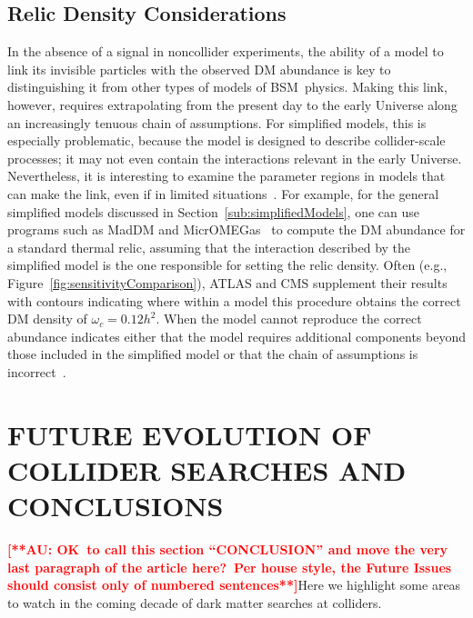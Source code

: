 \documentclass{ar-1col}
\newcommand{\IP}{invisible particle}
\begin{document}
\subsection{Relic Density Considerations}

In the absence of a signal in noncollider experiments, the ability of a
model to link its {\IP}s with the observed DM abundance is key to
distinguishing it from other types of models of BSM\ physics. Making this link, however, requires extrapolating
from the present day to the early Universe along an increasingly
tenuous chain of assumptions. For simplified models, this is
especially problematic, because the model is designed to describe
collider-scale processes; it may not even contain the interactions
relevant in the early Universe. Nevertheless, it is interesting to
examine the parameter regions in models that can make the link, even if in limited
situations~\cite{Busoni:2014gta,Catena:2017xqq}. For example, for
the general simplified models discussed in
Section~\ref{sub:simplifiedModels}, one can use programs
such as MadDM and
MicrOMEGas~\cite{Backovic:2015cra,Barducci:2016pcb} to compute  the DM
abundance for a standard thermal relic, assuming that the
interaction described by the simplified model is the one
responsible for setting the relic density. Often (e.g.,
Figure~\ref{fig:sensitivityComparison}), ATLAS and CMS supplement
their results with contours indicating where within a model this
procedure obtains the correct DM density of $\omega_c =
0.12 h^2$. When the model cannot reproduce the correct abundance indicates either that  the model requires additional
components beyond those included in the simplified model or that
the chain of assumptions is incorrect~\cite{Bernal:2017kxu}.

\section{FUTURE EVOLUTION OF COLLIDER SEARCHES AND CONCLUSIONS}\label{sec:05_Future}

\textbf{\textcolor{red}{[**AU: OK\ to call this section ``CONCLUSION'' and move the very last paragraph of the article here?\ Per house style, the Future Issues should consist only of numbered sentences**]}}Here we highlight some areas to watch in the coming decade of
dark matter searches at colliders.
\end{document}

